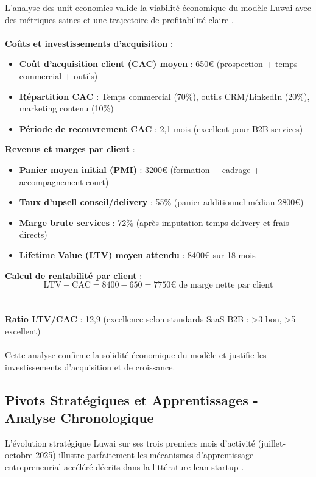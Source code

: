 L'analyse des unit economics valide la viabilité économique du modèle Luwai avec des métriques saines et une trajectoire de profitabilité claire \cite{luwai2025economics}.
\\\\
\textbf{Coûts et investissements d'acquisition} :
\begin{itemize}
    \item \textbf{Coût d'acquisition client (CAC) moyen} : 650€ (prospection + temps commercial + outils)
    \item \textbf{Répartition CAC} : Temps commercial (70\%), outils CRM/LinkedIn (20\%), marketing contenu (10\%)
    \item \textbf{Période de recouvrement CAC} : 2,1 mois (excellent pour B2B services)
\end{itemize}
\medskip
\textbf{Revenus et marges par client} :
\begin{itemize}
    \item \textbf{Panier moyen initial (PMI)} : 3200€ (formation + cadrage + accompagnement court)
    \item \textbf{Taux d'upsell conseil/delivery} : 55\% (panier additionnel médian 2800€)
    \item \textbf{Marge brute services} : 72\% (après imputation temps delivery et frais directs)
    \item \textbf{Lifetime Value (LTV) moyen attendu} : 8400€ sur 18 mois
\end{itemize}
\medskip
\textbf{Calcul de rentabilité par client} :
\[
\text{LTV} - \text{CAC} = 8400 - 650 = 7750\text{€ de marge nette par client}
\]
\\\\
\textbf{Ratio LTV/CAC} : 12,9 (excellence selon standards SaaS B2B : >3 bon, >5 excellent)
\\\\
Cette analyse confirme la solidité économique du modèle et justifie les investissements d'acquisition et de croissance.

\subsection{Pivots Stratégiques et Apprentissages - Analyse Chronologique}

L'évolution stratégique Luwai sur ses trois premiers mois d'activité (juillet-octobre 2025) illustre parfaitement les mécanismes d'apprentissage entrepreneurial accéléré décrits dans la littérature lean startup \cite{ries2011lean}.

